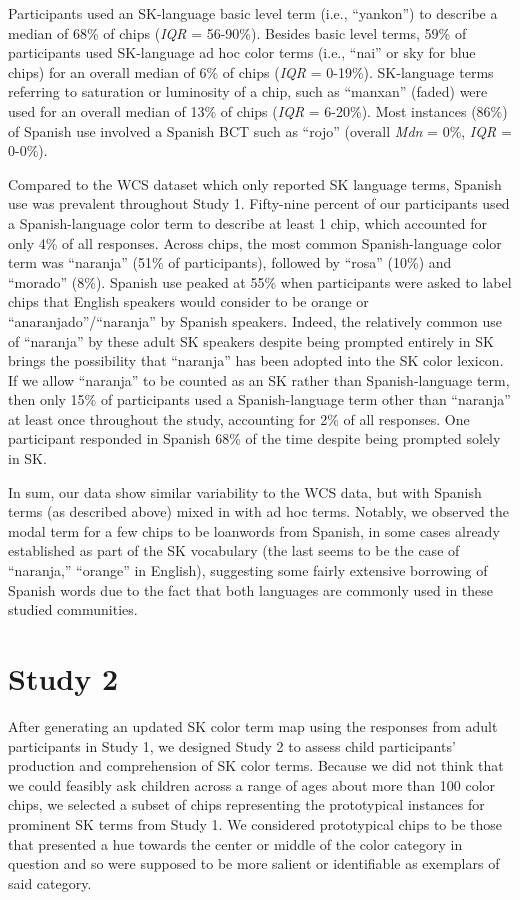\documentclass[
  ,apa7,floatsintext]{apa6}
\begin{document}
Participants used an SK-language basic level term (i.e., ``yankon'') to describe a median of 68\% of chips (\emph{IQR} = 56-90\%). Besides basic level terms, 59\% of participants used SK-language ad hoc color terms (i.e., ``nai'' or sky for blue chips) for an overall median of 6\% of chips (\emph{IQR} = 0-19\%). SK-language terms referring to saturation or luminosity of a chip, such as ``manxan'' (faded) were used for an overall median of 13\% of chips (\emph{IQR} = 6-20\%). Most instances (86\%) of Spanish use involved a Spanish BCT such as ``rojo'' (overall \emph{Mdn} = 0\%, \emph{IQR} = 0-0\%).

Compared to the WCS dataset which only reported SK language terms, Spanish use was prevalent throughout Study 1. Fifty-nine percent of our participants used a Spanish-language color term to describe at least 1 chip, which accounted for only 4\% of all responses. Across chips, the most common Spanish-language color term was ``naranja'' (51\% of participants), followed by ``rosa'' (10\%) and ``morado'' (8\%). Spanish use peaked at 55\% when participants were asked to label chips that English speakers would consider to be orange or ``anaranjado''/``naranja'' by Spanish speakers. Indeed, the relatively common use of ``naranja'' by these adult SK speakers despite being prompted entirely in SK brings the possibility that ``naranja'' has been adopted into the SK color lexicon. If we allow ``naranja'' to be counted as an SK rather than Spanish-language term, then only 15\% of participants used a Spanish-language term other than ``naranja'' at least once throughout the study, accounting for 2\% of all responses. One participant responded in Spanish 68\% of the time despite being prompted solely in SK.

In sum, our data show similar variability to the WCS data, but with Spanish terms (as described above) mixed in with ad hoc terms. Notably, we observed the modal term for a few chips to be loanwords from Spanish, in some cases already established as part of the SK vocabulary (the last seems to be the case of ``naranja,'' ``orange'' in English), suggesting some fairly extensive borrowing of Spanish words due to the fact that both languages are commonly used in these studied communities.

\hypertarget{study-2}{%
\section{Study 2}\label{study-2}}

After generating an updated SK color term map using the responses from adult participants in Study 1, we designed Study 2 to assess child participants' production and comprehension of SK color terms. Because we did not think that we could feasibly ask children across a range of ages about more than 100 color chips, we selected a subset of chips representing the prototypical instances for prominent SK terms from Study 1. We considered prototypical chips to be those that presented a hue towards the center or middle of the color category in question and so were supposed to be more salient or identifiable as exemplars of said category.
\end{document}
